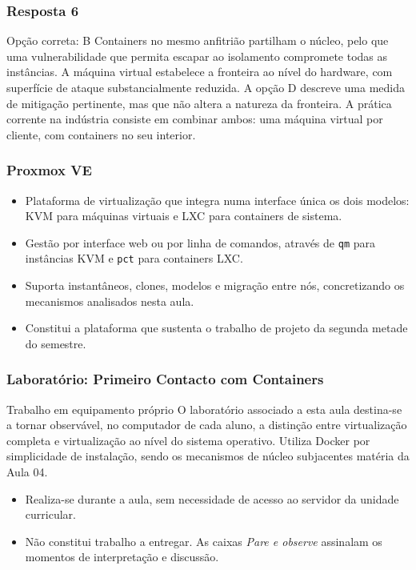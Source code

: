 \documentclass[aspectratio=169]{beamer}
\begin{document}
\begin{frame}
\frametitle{Resposta 6}
\begin{resposta}{Opção correta: B}
Containers no mesmo anfitrião partilham o núcleo, pelo que uma vulnerabilidade que permita escapar ao isolamento compromete todas as instâncias. A máquina virtual estabelece a fronteira ao nível do hardware, com superfície de ataque substancialmente reduzida. A opção D descreve uma medida de mitigação pertinente, mas que não altera a natureza da fronteira. A prática corrente na indústria consiste em combinar ambos: uma máquina virtual por cliente, com containers no seu interior.
\end{resposta}
\end{frame}

\begin{frame}
\frametitle{Proxmox VE}
\begin{itemize}
    \setlength\itemsep{0.4cm}
    \item Plataforma de virtualização que integra numa interface única os dois modelos: KVM para máquinas virtuais e LXC para containers de sistema.
    \item Gestão por interface web ou por linha de comandos, através de \texttt{qm} para instâncias KVM e \texttt{pct} para containers LXC.
    \item Suporta instantâneos, clones, modelos e migração entre nós, concretizando os mecanismos analisados nesta aula.
    \item Constitui a plataforma que sustenta o trabalho de projeto da segunda metade do semestre.
\end{itemize}
\end{frame}

\begin{frame}
\frametitle{Laboratório: Primeiro Contacto com Containers}
\begin{labbox}{Trabalho em equipamento próprio}
O laboratório associado a esta aula destina-se a tornar observável, no computador de cada aluno, a distinção entre virtualização completa e virtualização ao nível do sistema operativo. Utiliza Docker por simplicidade de instalação, sendo os mecanismos de núcleo subjacentes matéria da Aula 04.
\end{labbox}
\vspace{0.2cm}
\begin{itemize}
    \setlength\itemsep{0.25cm}
    \item Realiza-se durante a aula, sem necessidade de acesso ao servidor da unidade curricular.
    \item Não constitui trabalho a entregar. As caixas \emph{Pare e observe} assinalam os momentos de interpretação e discussão.
\end{itemize}
\end{frame}
\end{document}
